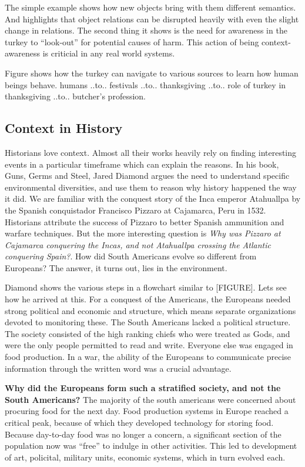 The simple example shows how new objects bring with them different semantics. And highlights that object relations can be disrupted heavily with even the slight change in relations. The second thing it shows is the need for awareness in the turkey to ``look-out'' for potential causes of harm. This action of being context-awareness is criticial in any real world systems.

Figure shows how the turkey can navigate to various sources to learn how human beings behave. humans ..to.. festivals ..to.. thanksgiving ..to.. role of turkey in thanksgiving ..to.. butcher's profession.

\subsection{Context in History}
Historians love context. Almost all their works heavily rely on finding interesting events in a particular timeframe which can explain the reasons. In his book, Guns, Germs and Steel, Jared Diamond argues the need to understand specific environmental diversities, and use them to reason why history happened the way it did. We are familiar with the conquest story of the Inca emperor Atahuallpa by the Spanish conquistador Francisco Pizzaro at Cajamarca, Peru in 1532. Historians attribute the success of Pizzaro to better Spanish ammunition and warfare techniques. But the more interesting question is \textit{Why was Pizzaro at Cajamarca conquering the Incas, and not Atahuallpa crossing the Atlantic conquering Spain?}. How did South Americans evolve so different from Europeans? The answer, it turns out, lies in the environment.

Diamond shows the various steps in a flowchart similar to [FIGURE]. Lets see how he arrived at this. For a conquest of the Americans, the Europeans needed strong political and economic and  structure, which means separate organizations devoted to monitoring these. The South Americans lacked a political structure. The society consisted of the high ranking chiefs who were treated as Gods, and were the only people permitted to read and write. Everyone else was engaged in food production. In a war, the ability of the Europeans to communicate precise information through the written word was a crucial advantage.

\textbf{Why did the Europeans form such a stratified society, and not the South Americans?} The majority of the south americans were concerned about procuring food for the next day. Food production systems in Europe reached a critical peak, because of which they developed technology for storing food. Because day-to-day food was no longer a concern, a significant section of the population now was ``free'' to indulge in other activities. This led to development of art, policital, military units, economic systems, which in turn evolved each.


